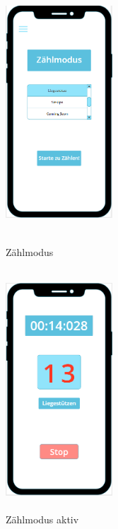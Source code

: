 \documentclass[a4paper,12pt]{article}
\begin{document}
\begin{figure}[ht!]
\begin{minipage}{0.4\textwidth}
		\includegraphics[width=4cm,height=9cm]{./Benutzeroberflaeche/Zaehlmodus.png}
		\caption{Zählmodus}		
	\end{minipage}
	\hfill
	\begin{minipage}{0.4\textwidth}	
		\includegraphics[width=4cm,height=9cm]{./Benutzeroberflaeche/Zaehlmodus_aktiv.png}
		\caption{Zählmodus aktiv}
		
	\end{minipage}
\end{figure}
\end{document}
